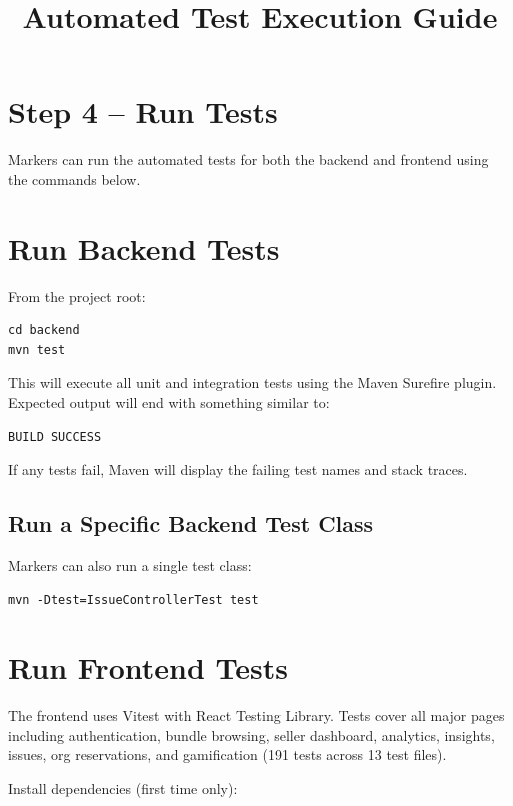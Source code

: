 \documentclass[12pt]{article}
\title{Automated Test Execution Guide}
\author{}
\date{}
\begin{document}
\maketitle

\section{Step 4 – Run Tests}

Markers can run the automated tests for both the backend and frontend using the commands below.


\section{Run Backend Tests}

From the project root:

\begin{lstlisting}
cd backend
mvn test
\end{lstlisting}

This will execute all unit and integration tests using the Maven Surefire plugin.
Expected output will end with something similar to:

\begin{lstlisting}
BUILD SUCCESS
\end{lstlisting}

If any tests fail, Maven will display the failing test names and stack traces.

\subsection{Run a Specific Backend Test Class}

Markers can also run a single test class:

\begin{lstlisting}
mvn -Dtest=IssueControllerTest test
\end{lstlisting}

\section{Run Frontend Tests}

The frontend uses Vitest with React Testing Library. Tests cover all major pages including
authentication, bundle browsing, seller dashboard, analytics, insights, issues, org
reservations, and gamification (191 tests across 13 test files).

Install dependencies (first time only):
\end{document}
